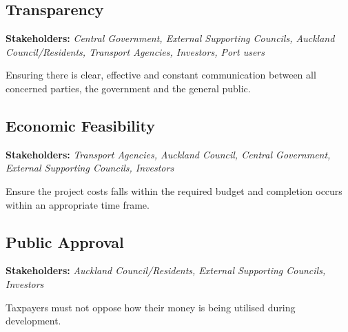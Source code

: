 \begin{multicols}{2}
\subsection*{Transparency}
    \begin{flushleft}
        \textbf{Stakeholders: }\textit{Central Government, External Supporting Councils, Auckland Council/Residents, Transport Agencies, Investors, Port users}
    \end{flushleft}
    \vspace{-3mm}
    Ensuring there is clear, effective and constant communication between all concerned parties, the government and the general public.
\subsection*{Economic Feasibility}
    \begin{flushleft}
        \textbf{Stakeholders: }\textit{Transport Agencies, Auckland Council, Central Government, External Supporting Councils, Investors}
    \end{flushleft}
    \vspace{-3mm}
    Ensure the project costs falls within the required budget and completion occurs within an appropriate time frame.
\subsection*{Public Approval}
    \begin{flushleft}
        \textbf{Stakeholders: }\textit{Auckland Council/Residents, External Supporting Councils, Investors}
    \end{flushleft}
    \vspace{-3mm}
    Taxpayers must not oppose how their money is being utilised during development.
    
\end{multicols}    


\clearpage